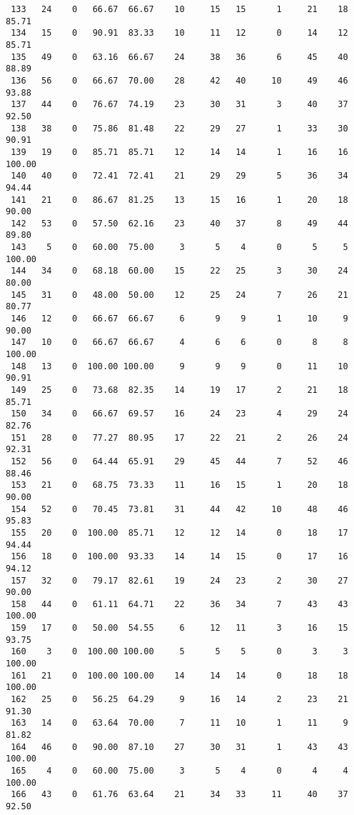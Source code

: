 \begin{verbatim}
 133   24    0   66.67  66.67    10     15   15      1     21    18    85.71
 134   15    0   90.91  83.33    10     11   12      0     14    12    85.71
 135   49    0   63.16  66.67    24     38   36      6     45    40    88.89
 136   56    0   66.67  70.00    28     42   40     10     49    46    93.88
 137   44    0   76.67  74.19    23     30   31      3     40    37    92.50
 138   38    0   75.86  81.48    22     29   27      1     33    30    90.91
 139   19    0   85.71  85.71    12     14   14      1     16    16   100.00
 140   40    0   72.41  72.41    21     29   29      5     36    34    94.44
 141   21    0   86.67  81.25    13     15   16      1     20    18    90.00
 142   53    0   57.50  62.16    23     40   37      8     49    44    89.80
 143    5    0   60.00  75.00     3      5    4      0      5     5   100.00
 144   34    0   68.18  60.00    15     22   25      3     30    24    80.00
 145   31    0   48.00  50.00    12     25   24      7     26    21    80.77
 146   12    0   66.67  66.67     6      9    9      1     10     9    90.00
 147   10    0   66.67  66.67     4      6    6      0      8     8   100.00
 148   13    0  100.00 100.00     9      9    9      0     11    10    90.91
 149   25    0   73.68  82.35    14     19   17      2     21    18    85.71
 150   34    0   66.67  69.57    16     24   23      4     29    24    82.76
 151   28    0   77.27  80.95    17     22   21      2     26    24    92.31
 152   56    0   64.44  65.91    29     45   44      7     52    46    88.46
 153   21    0   68.75  73.33    11     16   15      1     20    18    90.00
 154   52    0   70.45  73.81    31     44   42     10     48    46    95.83
 155   20    0  100.00  85.71    12     12   14      0     18    17    94.44
 156   18    0  100.00  93.33    14     14   15      0     17    16    94.12
 157   32    0   79.17  82.61    19     24   23      2     30    27    90.00
 158   44    0   61.11  64.71    22     36   34      7     43    43   100.00
 159   17    0   50.00  54.55     6     12   11      3     16    15    93.75
 160    3    0  100.00 100.00     5      5    5      0      3     3   100.00
 161   21    0  100.00 100.00    14     14   14      0     18    18   100.00
 162   25    0   56.25  64.29     9     16   14      2     23    21    91.30
 163   14    0   63.64  70.00     7     11   10      1     11     9    81.82
 164   46    0   90.00  87.10    27     30   31      1     43    43   100.00
 165    4    0   60.00  75.00     3      5    4      0      4     4   100.00
 166   43    0   61.76  63.64    21     34   33     11     40    37    92.50

\end{verbatim}
